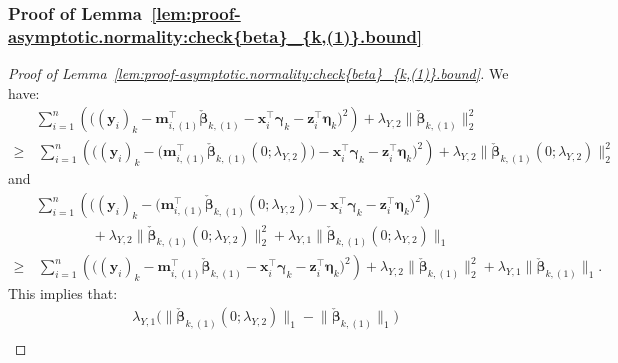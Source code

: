 \documentclass[
  12pt]{article}
\def\M{\mathbf{m}}
\def\X{\mathbf{x}}
\def\Y{\mathbf{y}}
\def\Z{\mathbf{z}}
\begin{document}
\subsubsection{Proof of Lemma~\ref{lem:proof-asymptotic.normality:check{beta}_{k,(1)}.bound}}
\label{sec:proof:lem:proof-asymptotic.normality:check{beta}_{k,(1)}.bound}
\begin{proof}[Proof of Lemma~\ref{lem:proof-asymptotic.normality:check{beta}_{k,(1)}.bound}]
	We have: 
	\begin{align*}  &    \sum_{i=1}^{n}  \left(   \big(  (\Y_{i})_{k}   -    \M_{i,(1)}^{\top} \check{\bm{\beta}}_{k,(1)}  -   \X_{i}^{\top} \bm{\gamma}_{k}   -   \Z_{i}^{\top} \bm{\eta}_{k}    \big)^{2}   
	\right)   
	+  \lambda_{Y,2}  \big\|  \check{\bm{\beta}}_{k,(1)}   \big\|_{2}^{2}   
	\\
	\geq  & \,  \sum_{i=1}^{n}  \left(   \big(  (\Y_{i})_{k}  -  \big( \M_{i,(1)} ^{\top} \check{\bm{\beta}}_{k,(1)} ( 0 ; \lambda_{Y,2}  )   \big)  -   \X_{i}^{\top} \bm{\gamma}_{k}   -   \Z_{i}^{\top} \bm{\eta}_{k}     
	\big)^{2}   
	\right)   
	+  \lambda_{Y,2}  \big\|   \check{\bm{\beta}}_{k,(1)} ( 0 ; \lambda_{Y,2} )    \big\|_{2}^{2}   
	\end{align*}
	and  
	\begin{align*}
		&  \sum_{i=1}^{n}   \left(   \big(    (\Y_{i})_{k}  -  \big( \M_{i,(1)} ^{\top} \check{\bm{\beta}}_{k,(1)} ( 0 ; \lambda_{Y,2}  )   \big)  -   \X_{i}^{\top} \bm{\gamma}_{k}   -   \Z_{i}^{\top} \bm{\eta}_{k}     
		\big)^{2}   
		\right)   
		\\
		& \qquad \qquad  +  \lambda_{Y,2}  \big\|   \check{\bm{\beta}}_{k,(1)} ( 0 ; \lambda_{Y,2} )    \big\|_{2}^{2}   
	 +  \lambda_{Y,1}  \big\|   \check{\bm{\beta}}_{k,(1)} ( 0 ; \lambda_{Y,2} )    \big\|_{1}
		\\
		\geq  &  \, \sum_{i=1}^{n}  \left(   \big(  (\Y_{i})_{k}   -    \M_{i,(1)}^{\top} \check{\bm{\beta}}_{k,(1)}  -   \X_{i}^{\top} \bm{\gamma}_{k}   -   \Z_{i}^{\top} \bm{\eta}_{k}     
		\big)^{2}   
		\right)   
		+   \lambda_{Y,2}    \big\|   \check{\bm{\beta}}_{k,(1)}    \big\|_{2}^{2}   +   \lambda_{Y,1}  \big\|  \check{\bm{\beta}}_{k,(1)}    \big\|_{1}.    
	\end{align*}
	This implies that:  
	\begin{align}
		&\lambda_{Y,1}  \Big(   \big\|   \check{\bm{\beta}}_{k,(1)} (0;\lambda_{Y,2})    \big\|_{1}  -  \big\|   \check{\bm{\beta}}_{k,(1)}    \big\|_{1}   \Big)   \nonumber  
		\\  

\end{align}
\end{proof}
\end{document}
